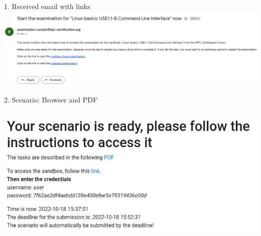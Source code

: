 \documentclass[compress,aspectratio=169]{beamer}
\begin{document}
\begin{frame}{1. Received email with links}
\includegraphics[width=\textwidth]{exam-email}
\end{frame}

\begin{frame}{2. Scenario: Browser and PDF}
\begin{columns}
\includegraphics[width=\textwidth]{exam-scenario}


\end{columns}
\end{frame}
\end{document}
